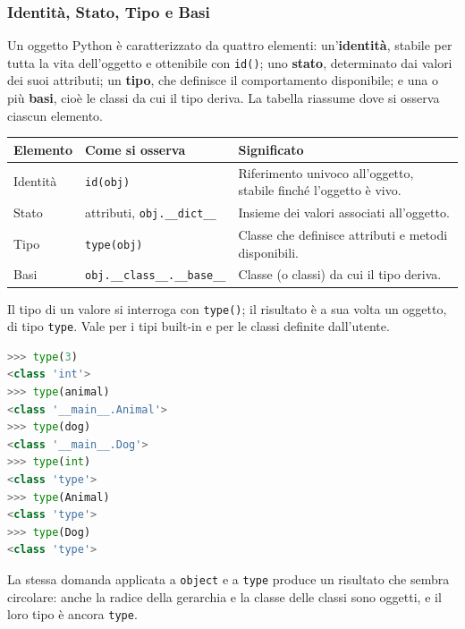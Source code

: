 \documentclass[12pt]{extarticle}
\begin{document}
\subsubsection{Identità, Stato, Tipo e Basi}

\noindent Un oggetto Python è caratterizzato da quattro elementi: un'\textbf{identità}, stabile per tutta la vita dell'oggetto e ottenibile con \texttt{id()}; uno \textbf{stato}, determinato dai valori dei suoi attributi; un \textbf{tipo}, che definisce il comportamento disponibile; e una o più \textbf{basi}, cioè le classi da cui il tipo deriva. La tabella riassume dove si osserva ciascun elemento.

\begin{center}
\small
\begin{tabular}{p{3.0cm}p{5.0cm}p{6.6cm}}
    \toprule
    \textbf{Elemento} & \textbf{Come si osserva} & \textbf{Significato} \\
    \midrule
    Identità & \texttt{id(obj)} & Riferimento univoco all'oggetto, stabile finché l'oggetto è vivo. \\
    \addlinespace
    Stato & attributi, \texttt{obj.\_\_dict\_\_} & Insieme dei valori associati all'oggetto. \\
    \addlinespace
    Tipo & \texttt{type(obj)} & Classe che definisce attributi e metodi disponibili. \\
    \addlinespace
    Basi & \texttt{obj.\_\_class\_\_.\_\_base\_\_} & Classe (o classi) da cui il tipo deriva. \\
    \bottomrule
\end{tabular}
\end{center}

\noindent Il tipo di un valore si interroga con \texttt{type()}; il risultato è a sua volta un oggetto, di tipo \texttt{type}. Vale per i tipi built-in e per le classi definite dall'utente.

\begin{lstlisting}[language=Python]
>>> type(3)
<class 'int'>
>>> type(animal)
<class '__main__.Animal'>
>>> type(dog)
<class '__main__.Dog'>
>>> type(int)
<class 'type'>
>>> type(Animal)
<class 'type'>
>>> type(Dog)
<class 'type'>
\end{lstlisting}

\noindent La stessa domanda applicata a \texttt{object} e a \texttt{type} produce un risultato che sembra circolare: anche la radice della gerarchia e la classe delle classi sono oggetti, e il loro tipo è ancora \texttt{type}.
\end{document}
